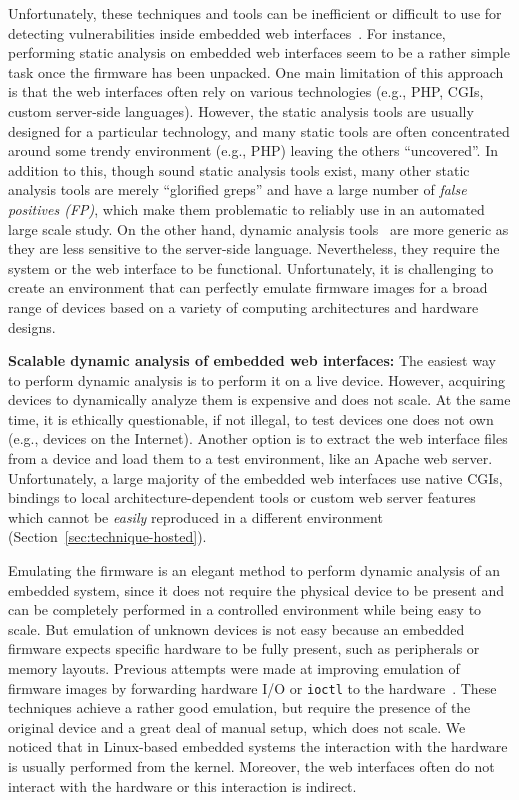 \documentclass[conference]{./templates/ndss/IEEEtran}
\newcounter{t0d0_counter}
\newcounter{pr00f_counter}
\begin{document}
Unfortunately, these techniques and tools can be inefficient or
difficult to use for detecting vulnerabilities inside embedded web
interfaces~\cite{fong2007web,elie-sp2010-AutoBlackBoxWebTest}.  
For instance, performing static analysis on embedded web interfaces seem to be 
a rather simple task once the firmware has been unpacked.
One main limitation of this approach is that the web interfaces often rely 
on various technologies (e.g., PHP, CGIs, custom server-side languages).
However, the static analysis tools are usually designed for a particular 
technology, and many static tools are often concentrated around some 
trendy environment (e.g., PHP) leaving the others ``uncovered''. 
In addition to this, 
though sound static analysis tools exist, many other static analysis 
tools are merely ``glorified greps'' and have a large number of \emph{false positives (FP)}, 
which make them problematic to reliably use in an 
automated large scale study. 
On the other hand, dynamic analysis tools~\cite{felmetsger2010toward, huang2003web}
are more generic as
they are less sensitive to the server-side language. Nevertheless, they
require the system or the web interface to be functional.  Unfortunately, it is
challenging to create an environment that can perfectly emulate firmware images for
a broad range of devices based on a variety of computing architectures and 
hardware designs. 


\noindent \textbf{Scalable dynamic analysis of embedded web interfaces:}
The easiest way to perform dynamic analysis is to perform it on a live
device. However, acquiring devices to dynamically analyze them is expensive and does not 
scale. At the same time, it is ethically questionable, if not illegal, to test devices 
one does not own (e.g., devices on the Internet).  
Another option is to
extract the web interface files from a device and
load them to a test environment, like an Apache web
server. Unfortunately, a large majority of the embedded web interfaces
use native CGIs, bindings to local architecture-dependent tools or 
custom web server features which cannot be \emph{easily} reproduced in 
a different environment (Section~\ref{sec:technique-hosted}). 

Emulating the firmware is an elegant method to perform dynamic
analysis of an embedded system, since it does not require the physical device to be
present and can be completely performed in a controlled
environment while being easy to scale. But emulation of unknown devices is not easy 
because an embedded firmware expects specific hardware to be fully present, such as
peripherals or memory layouts. 
Previous attempts were made at improving emulation of firmware images
by forwarding hardware I/O or \texttt{ioctl} to the
hardware~\cite{zaddach:ndss14,prospect}. These techniques achieve a rather good emulation, but
require the presence of the original device and a great deal of manual setup, 
which does not scale. We noticed that in Linux-based embedded systems 
the interaction with the hardware is usually performed from the kernel. 
Moreover, the web interfaces often do not interact with the hardware or 
this interaction is indirect. 
\end{document}
